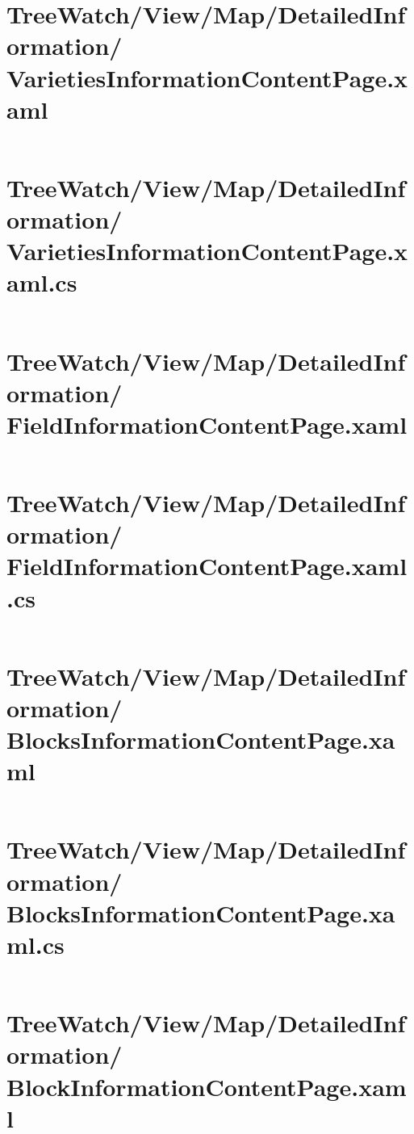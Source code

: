 \documentclass[12pt]{article}
\begin{document}
\pagebreak\section{TreeWatch/View/Map/DetailedInformation/ VarietiesInformationContentPage.xaml}
\inputminted[linenos]{xml}{../../../src/TreeWatch/View/Map/DetailedInformation/VarietiesInformationContentPage.xaml}

\pagebreak\section{TreeWatch/View/Map/DetailedInformation/ VarietiesInformationContentPage.xaml.cs}
\inputminted[linenos,firstline=22]{csharp}{../../../src/TreeWatch/View/Map/DetailedInformation/VarietiesInformationContentPage.xaml.cs}

\pagebreak\section{TreeWatch/View/Map/DetailedInformation/ FieldInformationContentPage.xaml}
\inputminted[linenos]{xml}{../../../src/TreeWatch/View/Map/DetailedInformation/FieldInformationContentPage.xaml}

\pagebreak\section{TreeWatch/View/Map/DetailedInformation/ FieldInformationContentPage.xaml.cs}
\inputminted[linenos,firstline=22]{csharp}{../../../src/TreeWatch/View/Map/DetailedInformation/FieldInformationContentPage.xaml.cs}

\pagebreak\section{TreeWatch/View/Map/DetailedInformation/ BlocksInformationContentPage.xaml}
\inputminted[linenos]{xml}{../../../src/TreeWatch/View/Map/DetailedInformation/BlocksInformationContentPage.xaml}

\pagebreak\section{TreeWatch/View/Map/DetailedInformation/ BlocksInformationContentPage.xaml.cs}
\inputminted[linenos,firstline=22]{csharp}{../../../src/TreeWatch/View/Map/DetailedInformation/BlocksInformationContentPage.xaml.cs}

\pagebreak\section{TreeWatch/View/Map/DetailedInformation/ BlockInformationContentPage.xaml}
\inputminted[linenos]{xml}{../../../src//TreeWatch/View/Map/DetailedInformation/BlockInformationContentPage.xaml}
\end{document}
